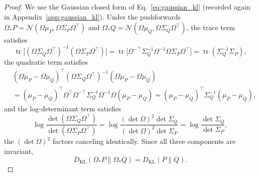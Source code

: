 \documentclass[11pt]{article}
\begin{document}
\begin{proof}
We use the Gaussian closed form of Eq.~\eqref{eq:gaussian_kl} (recorded again in Appendix~\ref{app:gaussian_kl}). Under the pushforwards $\Omega_* P = \mathcal{N}(\Omega\mu_P, \Omega\Sigma_P\Omega^\top)$ and $\Omega_* Q = \mathcal{N}(\Omega\mu_Q, \Omega\Sigma_Q\Omega^\top)$, the trace term satisfies
\begin{equation}
\operatorname{tr}\big[(\Omega\Sigma_Q\Omega^\top)^{-1}(\Omega\Sigma_P\Omega^\top)\big] = \operatorname{tr}\big[\Omega^{-\top}\Sigma_Q^{-1}\Omega^{-1}\Omega\Sigma_P\Omega^\top\big] = \operatorname{tr}(\Sigma_Q^{-1}\Sigma_P),
\end{equation}
the quadratic term satisfies
\begin{align}
&(\Omega\mu_P - \Omega\mu_Q)^\top (\Omega\Sigma_Q\Omega^\top)^{-1} (\Omega\mu_P - \Omega\mu_Q) \nonumber\\
&= (\mu_P - \mu_Q)^\top \Omega^\top \Omega^{-\top}\Sigma_Q^{-1}\Omega^{-1}\Omega (\mu_P - \mu_Q) = (\mu_P - \mu_Q)^\top \Sigma_Q^{-1}(\mu_P - \mu_Q),
\end{align}
and the log-determinant term satisfies
\begin{equation}
\log\frac{\det(\Omega\Sigma_Q\Omega^\top)}{\det(\Omega\Sigma_P\Omega^\top)} = \log\frac{(\det\Omega)^2 \det\Sigma_Q}{(\det\Omega)^2 \det\Sigma_P} = \log\frac{\det\Sigma_Q}{\det\Sigma_P},
\end{equation}
the $(\det\Omega)^2$ factors canceling identically. Since all three components are invariant,
\begin{equation}
D_{\mathrm{KL}}(\Omega_* P \| \Omega_* Q)
= D_{\mathrm{KL}}(P \| Q).
\end{equation}
\end{proof}
\end{document}
